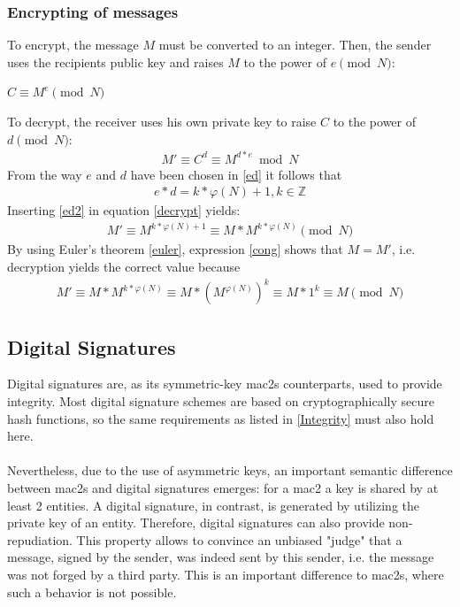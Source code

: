 \subsubsection{Encrypting of messages}

To encrypt, the message $M$ must be converted to an integer. Then, the sender uses the recipients public key and raises $M$ to the power of $e \pmod N$:
\begin{center}
 $C \equiv M^e \pmod N$
\end{center}
To decrypt, the receiver uses his own private key to raise $C$ to the power of $d \pmod N$:
\begin{align}\label{decrypt}
 M' \equiv C^d \equiv M^{d*e} \bmod N
\end{align}
From the way $e$ and $d$ have been chosen in \ref{ed} it follows that 
\begin{align}\label{ed2}
 e*d = k * \varphi(N) + 1, k \in \mathbb{Z} 
\end{align}
Inserting \ref{ed2} in equation \ref{decrypt} yields:
\begin{align}\label{cong}
  M' \equiv M^{k * \varphi(N) + 1} \equiv M* M^{k * \varphi(N)} \pmod N
\end{align}
By using Euler's theorem \ref{euler}, expression \ref{cong} shows that $M=M'$, i.e. decryption yields the correct value because
\begin{align*}
 M' \equiv M* M^{k * \varphi(N)} \equiv M* (M^{ \varphi(N)})^k \equiv M * 1^k \equiv M \pmod N
\end{align*} 

\subsection{Digital Signatures}\label{digitalSignatures}

Digital signatures are, as its symmetric-key \glspl{mac2} counterparts, used to provide integrity. Most digital signature schemes are based on
cryptographically secure hash functions, so the same requirements as listed in \ref{Integrity} must also hold here.
\\
\\
Nevertheless, due to the use of asymmetric keys, an important semantic difference between \glspl{mac2} and digital signatures emerges: for a \gls{mac2} 
a key is shared by at least 2 entities. A digital signature, in contrast, is generated by utilizing the private key of an entity. Therefore,
digital signatures can also provide non-repudiation.
This property allows to convince an unbiased "judge" that a message, signed by the sender, was indeed sent by this sender, i.e. the message was not
forged by a third party. This is an important difference to \glspl{mac2}, where such a behavior is not possible.

